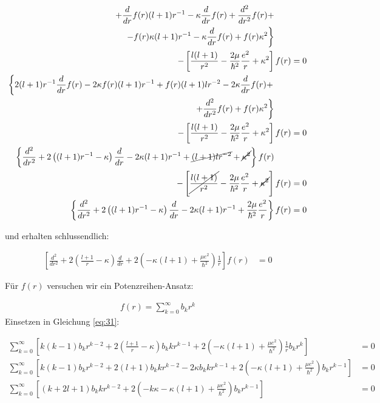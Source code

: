 \begin{align*}
+\frac{d}{dr} f(r)(l+1)r^{-1} -\kappa \frac{d}{dr} f(r)+\frac{d^2}{dr^2} f(r)+\qquad&\\
\left.- f(r)\kappa (l+1)r^{-1}-\kappa \frac{d}{dr}f(r)+ f(r)\kappa^2  \right\}\qquad&\\
- \left[\frac{l(l+1)}{r^2}- \frac{2\mu}{\hbar^2}\frac{e^2}{r} + \kappa^2  \right]f(r)   &= 0\\
\left\{2(l+1)r^{-1} \frac{d}{dr}f(r) - 2\kappa f(r) (l+1)r^{-1}+f(r)  (l+1)lr^{-2} -2\kappa \frac{d}{dr} f(r)+\right.\qquad& \\ 
\left. + \frac{d^2}{dr^2} f(r) +  f(r)\kappa^2  \right\}\qquad&\\
- \left[\frac{l(l+1)}{r^2}- \frac{2\mu}{\hbar^2}\frac{e^2}{r} + \kappa^2  \right]f(r)   &= 0\\
\left\{\frac{d^2}{dr^2} + 2\left((l+1)r^{-1}-\kappa\right)\frac{d}{dr} - 2\kappa (l+1)r^{-1}+\cancel{(l+1)lr^{-2}} +  \cancel{\kappa^2}  \right\} f(r) \qquad&\\
- \left[\cancel{ \frac{l(l+1)}{r^2}} - \frac{2\mu}{\hbar^2}\frac{e^2}{r} + \cancel{\kappa^2}  \right]f(r)   &= 0\\
\left\{\frac{d^2}{dr^2} + 2\left((l+1)r^{-1}-\kappa\right)\frac{d}{dr} - 2\kappa (l+1)r^{-1}+ \frac{2\mu}{\hbar^2}\frac{e^2}{r} \right\}f(r)   &= 0
\end{align*}

und erhalten schlussendlich:

\begin{align}
  \label{eq:31}
  \left[ \frac{d^2}{dr^2} + 2\left(\frac{l+1}{r}-\kappa\right)\frac{d}{dr} + 2 \left(-\kappa (l+1) + \frac{\mu e^2}{\hbar^2}\right) \frac{1}{r}  \right] f(r)&= 0
\end{align}

Für \(f(r)\) versuchen wir ein Potenzreihen-Ansatz:

\begin{align}
  \label{eq:32}
  f(r) = \sum^{\infty}_{k=0} b_k r^k
\end{align}
Einsetzen in Gleichung \eqref{eq:31}:

\begin{align*}
 \sum^{\infty}_{k=0} \left[ k(k-1) b_k r^{k-2} + 2\left(\frac{l+1}{r}-\kappa\right)b_k k r^{k-1} + 2 \left(-\kappa (l+1) + \frac{\mu e^2}{\hbar^2}  \right) \frac{1}{r}  b_k r^k \right]  &= 0 \\
 \sum^{\infty}_{k=0} \left[ k(k-1) b_k r^{k-2} + 2(l+1)b_k k r^{k-2}-2\kappa b_k k r^{k-1} + 2 \left(-\kappa (l+1) + \frac{\mu e^2}{\hbar^2}  \right)   b_k r^{k-1} \right]  &= 0 \\
 \sum^{\infty}_{k=0} \left[ (k+2l+1)b_k k r^{k-2}+ 2 \left(-k\kappa-\kappa (l+1) + \frac{\mu e^2}{\hbar^2}  \right)   b_k r^{k-1} \right]  &= 0
\end{align*}

